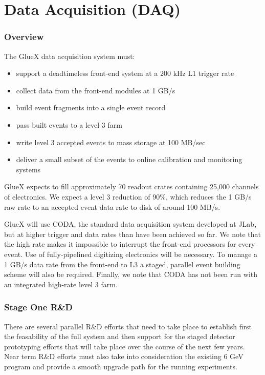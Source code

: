 \documentclass[10pt]{article}
\begin{document}
\section*{Data Acquisition (DAQ)}


\subsubsection*{Overview}

The GlueX data acquisition system must:
\begin{itemize}
\item support a deadtimeless front-end system at a 200 kHz L1 trigger rate
\item collect data from the front-end modules at 1 GB/s
\item build event fragments into a single event record
\item pass built events to a level 3 farm
\item write level 3 accepted events to mass storage at 100 MB/sec
\item deliver a small subset of the events to online calibration and
  monitoring systems
\end{itemize}

GlueX expects to fill approximately 70 readout crates 
containing 25,000 channels of electronics. 
We expect a level 3 reduction of 90\%, which reduces the 1 GB/s raw
rate to an accepted event data rate to disk of around 100 MB/s.

GlueX will use CODA, the standard data acquisition system developed at
JLab, but at higher trigger and data rates than have been achieved so far.
We note that the high rate makes it impossible to interrupt the front-end
processors for every event. Use of fully-pipelined digitizing electronics
will be necessary.  To manage a 1 GB/s data rate from the front-end to L3
a staged, parallel event building scheme will also be required. Finally,
we note that CODA has not been run with an integrated high-rate level 3 farm.

\subsubsection*{Stage One R\&D}

There are several parallel R\&D efforts that need to take place to
establish first the feasability of the full system and then support for
the staged detector prototyping efforts that will take place over the
course of the next few years. Near term R\&D efforts must also take into
consideration the existing 6 GeV program and provide a smooth upgrade path
for the running experiments.
\end{document}

